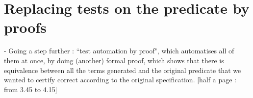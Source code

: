 \section{Replacing tests on the predicate by proofs}

\label{sect:aStepForward}



- Going a step further : ``test automation by proof", which automatises all of them at once, by doing (another) formal proof, which shows that there is equivalence between all the terms generated and the original predicate that we wanted to certify correct according to the original specification.
[half a page : from 3.45 to 4.15]